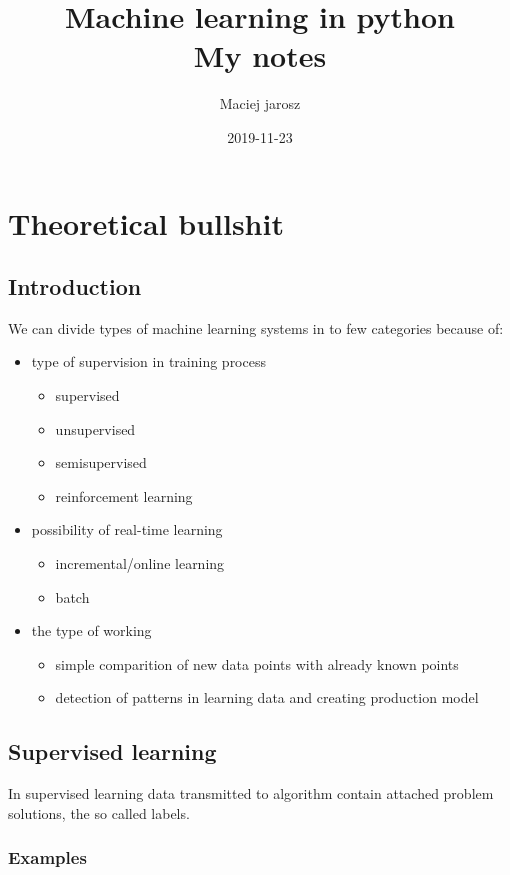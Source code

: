 \documentclass{article}
\title{Machine learning in python \\ My notes}
\date{2019-11-23}
\author{Maciej jarosz}
\begin{document}
\maketitle
\newpage
{}

\section{Theoretical bullshit}

  \subsection{Introduction}

  We can divide types of machine learning systems in to few categories because of:
  \begin{itemize}
    \item type of supervision in training process
    \begin{itemize}
      \item supervised
      \item unsupervised
      \item semisupervised
      \item reinforcement learning
    \end{itemize}
      \item possibility of real-time learning
    \begin{itemize}
      \item incremental/online learning
      \item batch
    \end{itemize}
      \item the type of working
    \begin{itemize}
      \item simple comparition of new data points with already known points
      \item detection of patterns in learning data and creating production model
    \end{itemize}
  \end{itemize}
  \newpage

  \subsection{Supervised learning}

  In supervised learning data transmitted to algorithm contain attached problem solutions, the so called labels.

    \subsubsection{Examples}
\end{document}
